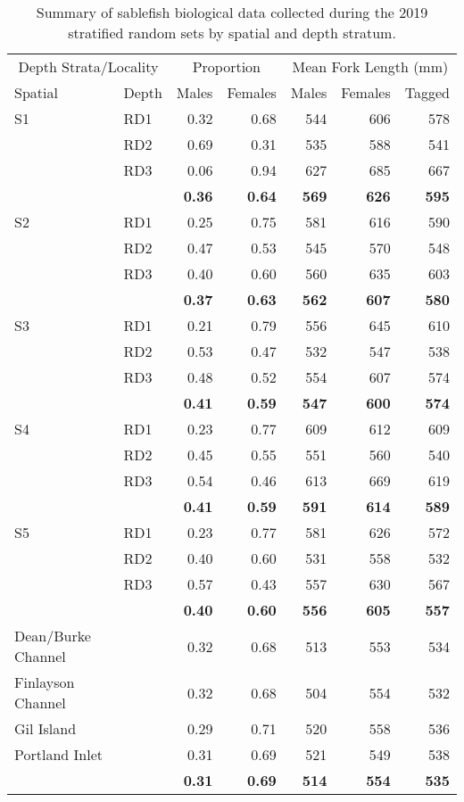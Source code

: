 \documentclass[12pt]{article}\usepackage[]{graphicx}\usepackage[]{color}
\begin{document}
\begin{table}

\caption{\label{tab:table8}Summary of sablefish biological data collected during the 2019 stratified random sets by spatial and depth stratum.}
\centering
\fontsize{8}{10}\selectfont
\begin{tabular}[t]{llrrrrr}
\toprule
\multicolumn{2}{c}{Depth Strata/Locality} & \multicolumn{2}{c}{Proportion} & \multicolumn{3}{c}{Mean Fork Length (mm)} \\
\cmidrule(l{3pt}r{3pt}){1-2} \cmidrule(l{3pt}r{3pt}){3-4} \cmidrule(l{3pt}r{3pt}){5-7}
Spatial & Depth & Males & Females & Males & Females & Tagged\\
\midrule
S1 & RD1 & 0.32 & 0.68 & 544 & 606 & 578\\
 & RD2 & 0.69 & 0.31 & 535 & 588 & 541\\
 & RD3 & 0.06 & 0.94 & 627 & 685 & 667\\
\hline
\textbf{} & \textbf{} & \textbf{0.36} & \textbf{0.64} & \textbf{569} & \textbf{626} & \textbf{595}\\
\hline
S2 & RD1 & 0.25 & 0.75 & 581 & 616 & 590\\
 & RD2 & 0.47 & 0.53 & 545 & 570 & 548\\
 & RD3 & 0.40 & 0.60 & 560 & 635 & 603\\
\hline
\textbf{} & \textbf{} & \textbf{0.37} & \textbf{0.63} & \textbf{562} & \textbf{607} & \textbf{580}\\
\hline
S3 & RD1 & 0.21 & 0.79 & 556 & 645 & 610\\
 & RD2 & 0.53 & 0.47 & 532 & 547 & 538\\
 & RD3 & 0.48 & 0.52 & 554 & 607 & 574\\
\hline
\textbf{} & \textbf{} & \textbf{0.41} & \textbf{0.59} & \textbf{547} & \textbf{600} & \textbf{574}\\
\hline
S4 & RD1 & 0.23 & 0.77 & 609 & 612 & 609\\
 & RD2 & 0.45 & 0.55 & 551 & 560 & 540\\
 & RD3 & 0.54 & 0.46 & 613 & 669 & 619\\
\hline
\textbf{} & \textbf{} & \textbf{0.41} & \textbf{0.59} & \textbf{591} & \textbf{614} & \textbf{589}\\
\hline
S5 & RD1 & 0.23 & 0.77 & 581 & 626 & 572\\
 & RD2 & 0.40 & 0.60 & 531 & 558 & 532\\
 & RD3 & 0.57 & 0.43 & 557 & 630 & 567\\
\hline
\textbf{} & \textbf{} & \textbf{0.40} & \textbf{0.60} & \textbf{556} & \textbf{605} & \textbf{557}\\
\hline
Dean/Burke Channel &  & 0.32 & 0.68 & 513 & 553 & 534\\
Finlayson Channel &  & 0.32 & 0.68 & 504 & 554 & 532\\
Gil Island &  & 0.29 & 0.71 & 520 & 558 & 536\\
Portland Inlet &  & 0.31 & 0.69 & 521 & 549 & 538\\
\hline
\textbf{} & \textbf{} & \textbf{0.31} & \textbf{0.69} & \textbf{514} & \textbf{554} & \textbf{535}\\
\bottomrule
\end{tabular}
\end{table}
\end{document}
